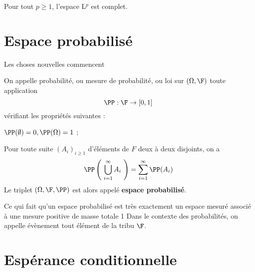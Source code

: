 \ep

\ep

\bp
Pour tout $p \geq 1$, l'espace L$^p$ est complet.
\ep


\section{Espace probabilisé}

Les choses nouvelles commencent 

\bigskip

On appelle probabilité, ou mesure de probabilité, ou loi sur $(\Omega, \F)$ toute application $$ \PP : \F \to [0,1]$$ vérifiant les propriétés suivantes : 
\ben
    \item $\PP(\emptyset) = 0, \PP(\Omega) = 1$ ;
    \item Pour toute suite $(A_i)_{i\geq 1}$ d'éléments de $F$ deux à deux disjoints, on a $$\PP \left( ~ \bigcup\limits_{i=1}^{\infty} A_i ~ \right) = \sum_{i=1}^{\infty} \PP(A_i)$$
\een
Le triplet $(\Omega, \F, \PP)$ est alors appelé \textbf{espace probabilisé}.

\bn 
Ce qui fait qu'un espace probabilisé est très exactement un espace mesuré associé à une mesure positive de masse totale 1 
\en
\bn
Dans le contexte des probabilités, on appelle évènement tout élément de la tribu $\F$.
\en
    
    
\section{Espérance conditionnelle}

